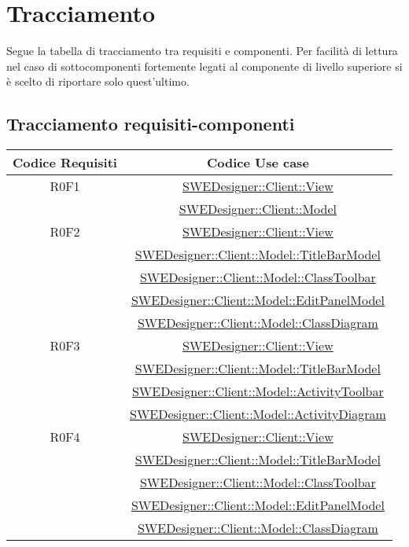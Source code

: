 \documentclass[../SpecificaTecnica.tex]{subfiles}
\begin{document}
	\section{Tracciamento}
	Segue la tabella di tracciamento tra requisiti e componenti.
	Per facilità di lettura nel caso di sottocomponenti fortemente legati al componente di livello superiore si è scelto di riportare solo quest'ultimo.
		
	\subsection{Tracciamento requisiti-componenti}
	\normalsize
	\begin{longtable}{|c|c|}
		\hline
		\textbf{Codice Requisiti} & \textbf{Codice Use case} \\
		\hline
		\endhead
		R0F1 & \hyperlink{SWEDesigner::Client::View}{SWEDesigner::Client::View}
		\\& \hyperlink{SWEDesigner::Client::Model}{SWEDesigner::Client::Model}\\\hline
		R0F2 & \hyperlink{SWEDesigner::Client::View}{SWEDesigner::Client::View} \\& \hyperlink{SWEDesigner::Client::Model::TitleBarModel}{SWEDesigner::Client::Model::TitleBarModel} \\& \hyperlink{SWEDesigner::Client::Model::ClassToolbar}{SWEDesigner::Client::Model::ClassToolbar} \\& \hyperlink{SWEDesigner::Client::Model::EditPanelModel}{SWEDesigner::Client::Model::EditPanelModel} \\& \hyperlink{SWEDesigner::Client::Model::ClassDiagram}{SWEDesigner::Client::Model::ClassDiagram} \\\hline
		R0F3 & \hyperlink{SWEDesigner::Client::View}{SWEDesigner::Client::View} \\& \hyperlink{SWEDesigner::Client::Model::TitleBarModel}{SWEDesigner::Client::Model::TitleBarModel} \\& \hyperlink{SWEDesigner::Client::Model::ActivityToolbar}{SWEDesigner::Client::Model::ActivityToolbar} \\& \hyperlink{SWEDesigner::Client::Model::ActivityDiagram}{SWEDesigner::Client::Model::ActivityDiagram} \\\hline
		R0F4 & \hyperlink{SWEDesigner::Client::View}{SWEDesigner::Client::View} \\& \hyperlink{SWEDesigner::Client::Model::TitleBarModel}{SWEDesigner::Client::Model::TitleBarModel} \\& \hyperlink{SWEDesigner::Client::Model::ClassToolbar}{SWEDesigner::Client::Model::ClassToolbar} \\& \hyperlink{SWEDesigner::Client::Model::EditPanelModel}{SWEDesigner::Client::Model::EditPanelModel} \\& \hyperlink{SWEDesigner::Client::Model::ClassDiagram}{SWEDesigner::Client::Model::ClassDiagram} \\\hline

\end{longtable}
\end{document}
